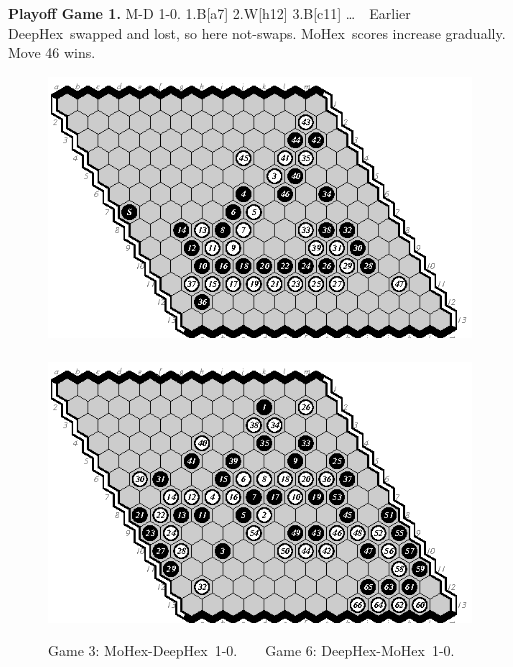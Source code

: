 \documentclass{icga}
\def\Dx{\mbox{\sc DeepHex}}
\def\Mx{\mbox{\sc MoHex}}
\begin{document}

{\bf Playoff Game 1.}
{\sc M-D 1-0.}
1.B[a7] 2.W[h12] 3.B[c11] \ldots \ \ 
Earlier \Dx\ swapped and lost, so here not-swaps.
\Mx{}ores increase gradually. Move 46 wins.


\begin{figure}[hbp]
\includegraphics[scale=1.3]{13.03m-d.swap.eps}\hspace*{-2.5cm}\
\includegraphics[scale=1.3]{13.06d-m.eps}
\caption{Game 3: \Mx-\Dx\ 1-0. ~ ~ Game 6: \Dx-\Mx\ 1-0.}
\end{figure}
\end{document}
